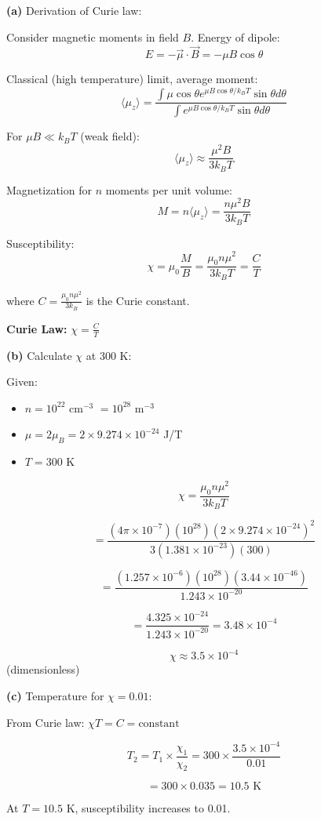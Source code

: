 \documentclass[12pt,a4paper]{article}
\begin{document}
\begin{solution}
\textbf{(a)} Derivation of Curie law:

Consider magnetic moments in field $B$. Energy of dipole:
$$E = -\vec{\mu} \cdot \vec{B} = -\mu B \cos\theta$$

Classical (high temperature) limit, average moment:
$$\langle \mu_z \rangle = \frac{\int \mu\cos\theta e^{\mu B\cos\theta/k_BT}\sin\theta d\theta}{\int e^{\mu B\cos\theta/k_BT}\sin\theta d\theta}$$

For $\mu B \ll k_BT$ (weak field):
$$\langle \mu_z \rangle \approx \frac{\mu^2 B}{3k_BT}$$

Magnetization for $n$ moments per unit volume:
$$M = n\langle \mu_z \rangle = \frac{n\mu^2 B}{3k_BT}$$

Susceptibility:
$$\chi = \mu_0\frac{M}{B} = \frac{\mu_0 n\mu^2}{3k_BT} = \frac{C}{T}$$

where $C = \frac{\mu_0 n\mu^2}{3k_B}$ is the Curie constant.

\textbf{Curie Law:} $\boxed{\chi = \frac{C}{T}}$

\textbf{(b)} Calculate $\chi$ at 300 K:

Given:
\begin{itemize}
    \item $n = 10^{22}$ cm$^{-3}$ $= 10^{28}$ m$^{-3}$
    \item $\mu = 2\mu_B = 2 \times 9.274 \times 10^{-24}$ J/T
    \item $T = 300$ K
\end{itemize}

$$\chi = \frac{\mu_0 n\mu^2}{3k_BT}$$

$$= \frac{(4\pi \times 10^{-7})(10^{28})(2 \times 9.274 \times 10^{-24})^2}{3(1.381 \times 10^{-23})(300)}$$

$$= \frac{(1.257 \times 10^{-6})(10^{28})(3.44 \times 10^{-46})}{1.243 \times 10^{-20}}$$

$$= \frac{4.325 \times 10^{-24}}{1.243 \times 10^{-20}} = 3.48 \times 10^{-4}$$

$$\chi \approx 3.5 \times 10^{-4}$$ (dimensionless)

\textbf{(c)} Temperature for $\chi = 0.01$:

From Curie law: $\chi T = C = \text{constant}$

$$T_2 = T_1 \times \frac{\chi_1}{\chi_2} = 300 \times \frac{3.5 \times 10^{-4}}{0.01}$$

$$= 300 \times 0.035 = 10.5\text{ K}$$

At $T = 10.5$ K, susceptibility increases to 0.01.


\end{solution}
\end{document}
